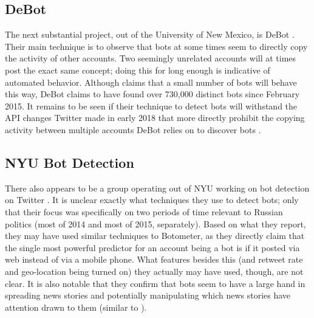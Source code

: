 \documentclass[11pt]{article}
\begin{document}
\subsection{DeBot}
The next substantial project, out of the University of New Mexico, is DeBot \cite{debot}. Their main technique is to observe that bots at some times seem to directly copy the activity of other accounts. Two seemingly unrelated accounts will at times post the exact same concept; doing this for long enough is indicative of automated behavior. Although \cite{botometer-paper} claims that a small number of bots will behave this way, DeBot claims to have found over 730,000 distinct bots since February 2015. It remains to be seen if their technique to detect bots will withstand the API changes Twitter made in early 2018 that more directly prohibit the copying activity between multiple accounts DeBot relies on to discover bots \cite{curb-bots}.

\subsection{NYU Bot Detection}
There also appears to be a group operating out of NYU working on bot detection on Twitter \cite{nyu}. It is unclear exactly what techniques they use to detect bots; only that their focus was specifically on two periods of time relevant to Russian politics (most of 2014 and most of 2015, separately). Based on what they report, they may have used similar techniques to Botometer, as they directly claim that the single most powerful predictor for an account being a bot is if it posted via web instead of via a mobile phone. What features besides this (and retweet rate and geo-location being turned on) they actually may have used, though, are not clear. It is also notable that they confirm that bots seem to have a large hand in spreading news stories and potentially manipulating which news stories have attention drawn to them (similar to \cite{anatomy}).
\end{document}
